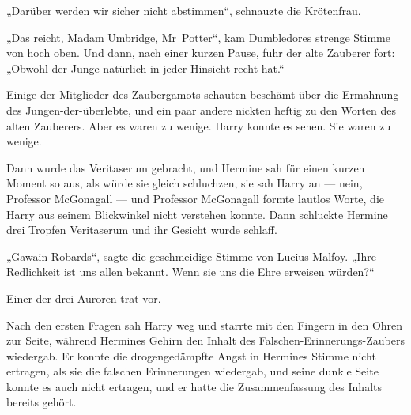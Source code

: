 „Darüber werden wir sicher nicht abstimmen“, schnauzte die Krötenfrau.

„Das reicht, Madam Umbridge, Mr~Potter“, kam Dumbledores strenge Stimme von hoch oben. Und dann, nach einer kurzen Pause, fuhr der alte Zauberer fort:
„Obwohl der Junge natürlich in jeder Hinsicht recht hat.“

Einige der Mitglieder des Zaubergamots schauten beschämt über die Ermahnung des Jungen-der-überlebte, und ein paar andere nickten heftig zu den Worten des alten Zauberers. Aber es waren zu wenige. Harry konnte es sehen. Sie waren zu wenige.

Dann wurde das Veritaserum gebracht, und Hermine sah für einen kurzen Moment so aus, als würde sie gleich schluchzen, sie sah Harry an — nein, Professor McGonagall — und Professor McGonagall formte lautlos Worte, die Harry aus seinem Blickwinkel nicht verstehen konnte. Dann schluckte Hermine drei Tropfen Veritaserum und ihr Gesicht wurde schlaff.

„Gawain Robards“, sagte die geschmeidige Stimme von Lucius Malfoy.
„Ihre Redlichkeit ist uns allen bekannt. Wenn sie uns die Ehre erweisen würden?“

Einer der drei Auroren trat vor.

Nach den ersten Fragen sah Harry weg und starrte mit den Fingern in den Ohren zur Seite, während Hermines Gehirn den Inhalt des Falschen-Erinnerungs-Zaubers wiedergab. Er konnte die drogengedämpfte Angst in Hermines Stimme nicht ertragen, als sie die falschen Erinnerungen wiedergab, und seine dunkle Seite konnte es auch nicht ertragen, und er hatte die Zusammenfassung des Inhalts bereits gehört.

